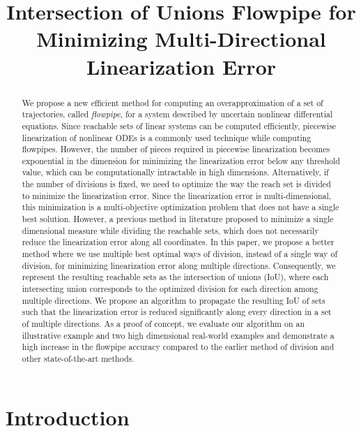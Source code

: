 


\title{Intersection of Unions Flowpipe for Minimizing Multi-Directional Linearization Error}
\author{}
\institute{}
%
    
\maketitle
%
\begin{abstract}
We propose a new efficient method for computing an overapproximation
of a set of trajectories, called \emph{flowpipe}, for a system
described by uncertain nonlinear differential equations.  Since
reachable sets of linear systems can be computed efficiently,
piecewise linearization of nonlinear ODEs is a commonly used technique
while computing flowpipes.  However, the number of pieces required in
piecewise linearization becomes exponential in the dimension for
minimizing the linearization error below any threshold value, which
can be computationally intractable in high dimensions.  Alternatively,
if the number of divisions is fixed, we need to optimize the way the
reach set is divided to minimize the linearization error.  Since the
linearization error is multi-dimensional, this minimization is a
multi-objective optimization problem that does not have a single best
solution.  However, a previous method in literature proposed to
minimize a single dimensional measure while dividing the reachable
sets, which does not necessarily reduce the linearization error along
all coordinates.  In this paper, we propose a better method where we
use multiple best optimal ways of division, instead of a single way of
division, for minimizing linearization error along multiple
directions.  Consequently, we represent the resulting reachable sets
as the intersection of unions (IoU), where each intersecting union
corresponds to the optimized division for each direction among
multiple directions.  We propose an algorithm to propagate the
resulting IoU of sets such that the linearization error is reduced
significantly along every direction in a set of multiple directions.
As a proof of concept, we evaluate our algorithm on an illustrative
example and two high dimensional real-world examples and demonstrate a
high increase in the flowpipe accuracy compared to the earlier method
of division and other state-of-the-art methods.
\end{abstract}

\section{Introduction}

%

